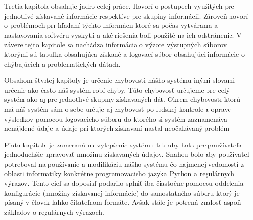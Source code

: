 Tretia kapitola obsahuje jadro celej práce. Hovorí o postupoch využitých pre jednotlivé získavané informácie respektíve pre skupiny informácii. Zároveň hovorí o problémoch pri hľadaní týchto informácii ktoré sa počas vytvárania a nastavovania softvéru vyskytli a aké riešenia boli použité na ich odstránenie. V závere tejto kapitole sa nachádza informácia o výzore výstupných súborov ktorými sú tabuľka obsahujúca získané a logovací súbor obsahujúci informácie o chýbajúcich a problematických dátach. 

Obsahom štvrtej kapitoly je určenie chybovosti nášho systému inými slovami určenie ako často náš systém robí chyby. Túto chybovosť určujeme pre celý systém ako aj pre jednotlivé skupiny získavaných dát. Okrem chybovosti ktorú má náš systém sám o sebe určuje aj chybovosť po ľudskej kontrole a oprave výsledkov pomocou logovacieho súboru do ktorého si systém zaznamenáva nenájdené údaje a údaje pri ktorých získavaní nastal neočakávaný problém.

Piata kapitola je zameraná na vylepšenie systému tak aby bolo pre používateľa jednoduchšie upravovať množinu získavaných údajov. Snahou bolo aby používateľ potreboval na používanie a modifikáciu nášho systému čo najmenej vedomostí z oblasti informatiky konkrétne programovacieho jazyka Python a regulárnych výrazov. Tento cieľ sa doposiaľ podarilo spĺniť iba čiastočne pomocou oddelenia konfigurácie (množiny získavanej informácie) do samostatného súboru ktorý je písaný v človek ľahko čitateľnom formáte. Avšak stále je potrená znalosť aspoň základov o regulárnych výrazoch.  

